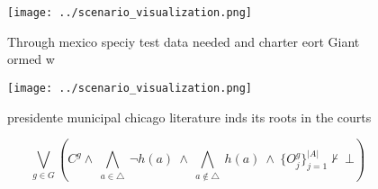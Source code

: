 \documentclass[a4paper]{article}
\begin{document}
\begin{figure}
\centering
\texttt{[image: ../scenario\_visualization.png]}
\caption{Through mexico speciy test data needed and charter eort Giant ormed w
}
\end{figure}
 
\begin{figure}
\centering
\texttt{[image: ../scenario\_visualization.png]}
\caption{presidente municipal chicago literature inds its roots in the courts 
}
\end{figure}
 
\[\bigvee_{g\in G} (C^g \wedge\ \bigwedge_{a\in \triangle}\ \neg h(a)\ \wedge\ \bigwedge_{a\notin \triangle}\ h(a)\ \wedge\ \{O_j^g\}_{j=1}^{|A|} \nvdash\ \bot )\]
\end{document}
